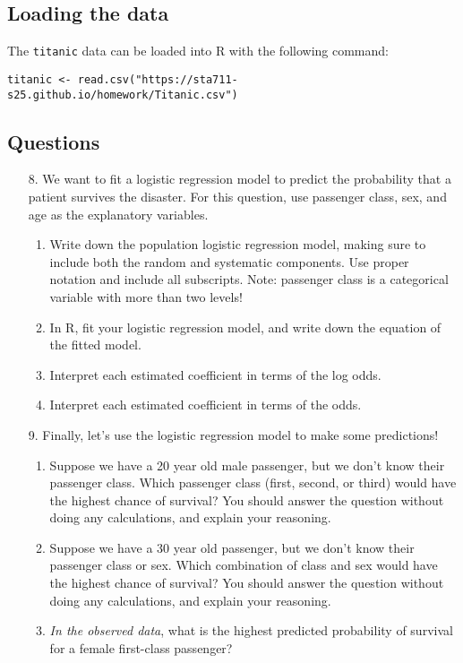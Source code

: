 \documentclass[11pt]{article}
\begin{document}
\subsection*{Loading the data}

The \verb;titanic; data can be loaded into R with the following command:

\begin{verbatim}
titanic <- read.csv("https://sta711-s25.github.io/homework/Titanic.csv")
\end{verbatim}


\subsection*{Questions}

\begin{enumerate}
\item[8.] We want to fit a logistic regression model to predict the probability that a patient survives the disaster. For this question, use passenger class, sex, and age as the explanatory variables.

\begin{enumerate}
\item Write down the population logistic regression model, making sure to include both the random and systematic components. Use proper notation and include all subscripts. Note: passenger class is a categorical variable with more than two levels! 

\item In R, fit your logistic regression model, and write down the equation of the fitted model.

\item Interpret each estimated coefficient in terms of the log odds.

\item Interpret each estimated coefficient in terms of the odds.
\end{enumerate}

\item[9.] Finally, let's use the logistic regression model to make some predictions!

\begin{enumerate}
\item Suppose we have a 20 year old male passenger, but we don't know their passenger class. Which passenger class (first, second, or third) would have the highest chance of survival? You should answer the question without doing any calculations, and explain your reasoning.

\item Suppose we have a 30 year old passenger, but we don't know their passenger class or sex. Which combination of class and sex would have the highest chance of survival? You should answer the question without doing any calculations, and explain your reasoning.

\item \textit{In the observed data}, what is the highest predicted probability of survival for a female first-class passenger?

\end{enumerate}
\end{enumerate}
\end{document}
